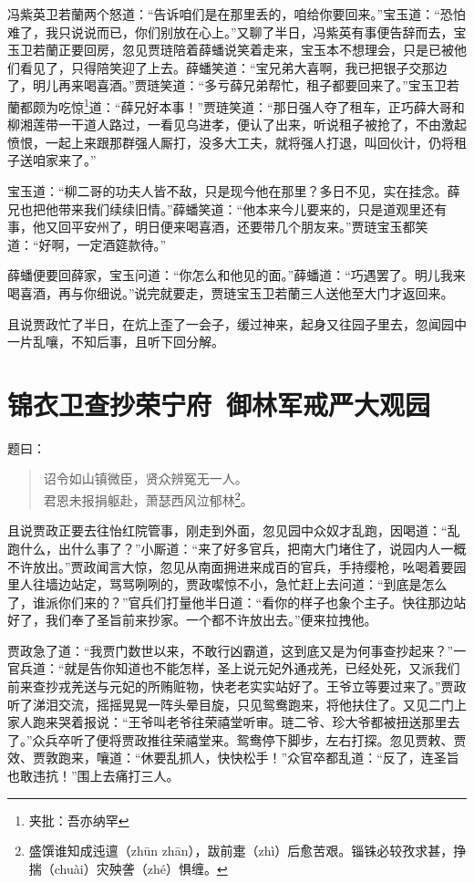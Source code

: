 \documentclass[12pt,oneside]{book}
\newenvironment{shici}{%
\begin{verse}%
\centering\large\hspace{12pt}}%
{\end{verse}}
\begin{document}
冯紫英卫若蘭两个怒道：“告诉咱们是在那里丢的，咱给你要回来。”宝玉道：“恐怕难了，我只说说而已，你们别放在心上。”又聊了半日，冯紫英有事便告辞而去，宝玉卫若蘭正要回房，忽见贾琏陪着薛蟠说笑着走来，宝玉本不想理会，只是已被他们看见了，只得陪笑迎了上去。薛蟠笑道：“宝兄弟大喜啊，我已把银子交那边了，明儿再来喝喜酒。”贾琏笑道：“多亏薛兄弟帮忙，租子都要回来了。”宝玉卫若蘭都颇为吃惊\footnote{夹批：吾亦纳罕}道：“薛兄好本事！”贾琏笑道：“那日强人夺了租车，正巧薛大哥和柳湘莲带一干道人路过，一看见乌进孝，便认了出来，听说租子被抢了，不由激起愤恨，一起上来跟那群强人厮打，没多大工夫，就将强人打退，叫回伙计，仍将租子送咱家来了。”

宝玉道：“柳二哥的功夫人皆不敌，只是现今他在那里？多日不见，实在挂念。薛兄也把他带来我们续续旧情。”薛蟠笑道：“他本来今儿要来的，只是道观里还有事，他又回平安州了，明日便来喝喜酒，还要带几个朋友来。”贾琏宝玉都笑道：“好啊，一定酒筵款待。”

薛蟠便要回薛家，宝玉问道：“你怎么和他见的面。”薛蟠道：“巧遇罢了。明儿我来喝喜酒，再与你细说。”说完就要走，贾琏宝玉卫若蘭三人送他至大门才返回来。

且说贾政忙了半日，在炕上歪了一会子，缓过神来，起身又往园子里去，忽闻园中一片乱嚷，不知后事，且听下回分解。


 
\chapter{锦衣卫查抄荣宁府~御林军戒严大观园}

题曰：

\begin{shici}
诏令如山镇微臣，贤众辨冤无一人。\\
君恩未报捐躯赴，萧瑟西风泣郁林\footnote{盛馔谁知成迍邅（zhūn zhān），跋前疐（zhì）后愈苦艰。锱铢必较孜求甚，挣揣（chuài）灾殃詟（zhé）惧缠。}。
\end{shici}



且说贾政正要去往怡红院管事，刚走到外面，忽见园中众奴才乱跑，因喝道：“乱跑什么，出什么事了？”小厮道：“来了好多官兵，把南大门堵住了，说园内人一概不许放出。”贾政闻言大惊，忽见从南面拥进来成百的官兵，手持缨枪，吆喝着要园里人往墙边站定，骂骂咧咧的，贾政噄惊不小，急忙赶上去问道：“到底是怎么了，谁派你们来的？”官兵们打量他半日道：“看你的样子也象个主子。快往那边站好了，我们奉了圣旨前来抄家。一个都不许放出去。”便来拉拽他。

贾政急了道：“我贾门数世以来，不敢行凶霸道，这到底又是为何事查抄起来？”一官兵道：“就是告你知道也不能怎样，圣上说元妃外通戎羌，已经处死，又派我们前来查抄戎羌送与元妃的所贿赃物，快老老实实站好了。王爷立等要过来了。”贾政听了涕泪交流，摇摇晃晃一阵头晕目旋，只见鸳鸯跑来，将他扶住了。又见二门上家人跑来哭着报说：“王爷叫老爷往荣禧堂听审。琏二爷、珍大爷都被扭送那里去了。”众兵卒听了便将贾政推往荣禧堂来。鸳鸯停下脚步，左右打探。忽见贾敕、贾效、贾敦跑来，嚷道：“休要乱抓人，快快松手！”众官卒都乱道：“反了，连圣旨也敢违抗！”围上去痛打三人。
\end{document}
